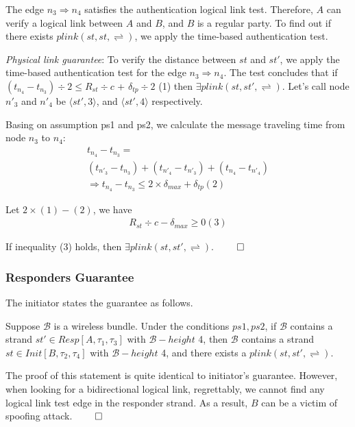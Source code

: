 The edge $n_3 \Rightarrow n_4$ satisfies the authentication logical link test. Therefore, $A$ can verify a logical link between $A$ and $B$, and $B$ is a regular party. To find out if there exists $plink(st,st,\rightleftharpoons)$, we apply the time-based authentication test.  

\emph{Physical link guarantee}: To verify the distance between $st$ and $st'$, we apply the time-based authentication test for the edge $n_3 \Rightarrow n_4$. The test concludes that if $(t_{n_4} - t_{n_3}) \div 2 \le R_{st} \div c$ + $\delta_{tp} \div 2$ (1) then $\exists plink(st,st', \rightleftharpoons)$. Let's call node $n'_3$ and $n'_4$ be $\langle st',3\rangle$, and $\langle st',4\rangle$ respectively. 

Basing on assumption ps1 and ps2, we calculate the message traveling time from node $n_3$ to $n_4$:
\begin{equation*}
\label{equation1}
\begin{split}
t_{n_4} - t_{n_3} = \\
(t_{n'_3} - t_{n_3}) + (t_{n'_4} - t_{n'_3}) + (t_{n_4} - t_{n'_4}) \\
\Rightarrow t_{n_4} - t_{n_3} \le 2 \times \delta_{max} + \delta_{tp} (2)
\end{split}
\end{equation*}

 Let $2\times(1) - (2)$, we have
\begin{equation*}
\label{equation2}
\begin{split}
	R_{st} \div c - \delta_{max} \ge 0 (3)
\end{split}
\end{equation*}

If inequality (3) holds, then $\exists plink(st,st', \rightleftharpoons)$. $\qed$
  
\subsubsection*{Responders Guarantee}

The initiator states the guarantee as follows.

Suppose $\mathcal{B}$ is a wireless bundle. Under the conditions $ps1, ps2$, if $\mathcal{B}$ contains a strand $st' \in Resp[A,\tau_1,\tau_3]$ with $\mathcal{B} -height$ 4, then $\mathcal{B}$ contains a strand $st \in Init[B,\tau_2,\tau_4]$ with $\mathcal{B} -height$ 4, and there exists a $plink(st,st',\rightleftharpoons)$. 

The proof of this statement is quite identical to initiator's guarantee. However, when looking for a bidirectional logical link, regrettably, we cannot find any logical link test edge in the responder strand. As a result, $B$ can be a victim of spoofing attack. $\qed$ 
 
